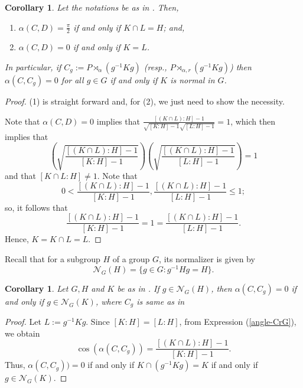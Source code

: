 \documentclass[a4]{amsart}
\newtheorem{corollary}[theorem]{\bf Corollary}
\numberwithin{equation}{section}
\newcommand{\mcal}{\mathcal}
\begin{document}
        \begin{corollary}\label{Coro_4.3}
          Let the notations be as in  . Then,
          \begin{enumerate}
          \item $\alpha(C, D)= \frac{\pi}{2}$ if and only if $K \cap L = H$; and,
          \item $\alpha (C, D) =
            0$ if and only if $K = L$.
          \end{enumerate}
 In particular, if $C_g:=P \rtimes_{\alpha}(g^{-1}Kg)$ (resp., $P \rtimes_{\alpha,r}(g^{-1}Kg) $)
 then $\alpha(C,C_g)=0$ for all $g \in G$ if and only if $K$ is normal in
 $G$.
 \end{corollary}
        \begin{proof}
          (1) is straight forward and, for (2), we just need to show the necessity.

          Note that $\alpha(C,D)=0$
          implies that $ \frac{[(K \cap L) : H]-1}{\sqrt{[K:H] -1}
            \sqrt{[L:H] - 1}} =1$, which then implies that
          \[
          \left(\sqrt{\frac{[(K \cap L) : H]-1}{[K:H] -1}} \right)
\left(\sqrt{\frac{[(K \cap L) : H]-1}{[L:H] -1}} \right)           = 1
          \]
          and
          that $[K \cap L : H] \neq 1$. Note that
          \[
0<          \frac{{[(K \cap L) : H]-1}}{{[K:H] -1}}, \frac{{[(K \cap L) : H]-1}}{{[L:H] -1}}  \leq 1;
          \]
          so, it follows that 
          \[
\frac{{[(K \cap L) : H]-1}}{{[K:H] -1}} = 1= \frac{{[(K \cap L) : H]-1}}{{[L:H] -1}}. 
          \]
Hence, $K = K \cap L  = L$.
                \end{proof}


        Recall that for a subgroup $H$ of a group $G$, its normalizer
        is given by
        \[
\mathcal{N}_G(H)=\{g\in G: g^{-1}Hg=H\}.
        \]
        \begin{corollary}
          Let $G, H$ and $K$ be as in . If $g \in
          \mathcal{N}_G(H)$,  then
          $\alpha(C,C_g)= 0$ if and only if
          $g \in \mathcal{N}_G(K)$, where $C_g$ is same as in 
        \end{corollary}
 
        \begin{proof} Let $L:=g^{-1}Kg$.
Since $[K:H] = [L:H] $, from Expression (\ref{angle-CrG}), we obtain
\[
\cos(\alpha(C,C_g)) = \frac{[(K\cap
    L):H]-1}{[K:H]-1}.
\]
Thus, $\alpha(C, C_g))=0$ if and only if $K \cap (g^{-1}Kg)
= K$ if and only if $g \in \mcal{N}_G(K)$.
          \end{proof}
\end{document}
